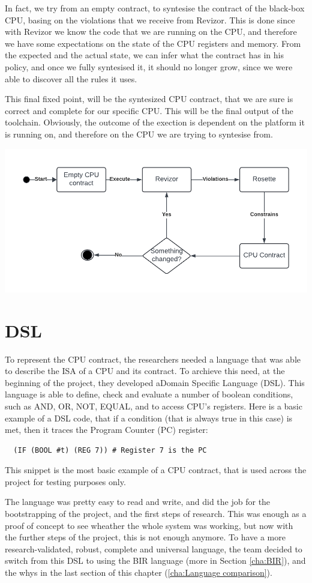 In fact, we try from an empty contract, to syntesise the contract of the black-box
CPU, basing on the violations that we receive from Revizor. This is done since with
Revizor we know the code that we are running on the CPU, and therefore we have
some expectations on the state of the CPU registers and memory. From the expected
and the actual state, we can infer what the contract has in his policy, and once
we fully syntesised it, it should no longer grow, since we were able to discover
all the rules it uses.

This final fixed point, will be the syntesized CPU contract, that we are sure is
correct and complete for our specific CPU. This will be the final output of the
toolchain. Obviously, the outcome of the exection is dependent on the platform
it is running on, and therefore on the CPU we are trying to syntesise from.
\begin{center}
  \includegraphics[width=.6\textwidth]{images/Thesis.png}
\end{center}

\section{DSL}
\label{cha:DSL} To represent the CPU contract, the researchers needed a language
that was able to describe the ISA of a CPU and its contract. To archieve this need,
at the beginning of the project, they developed aDomain Specific Language (DSL).
This language is able to define, check and evaluate a number of boolean conditions,
such as AND, OR, NOT, EQUAL, and to access CPU's registers. Here is a basic example
of a DSL code, that if a condition (that is always true in this case) is met, then
it traces the Program Counter (PC) register:

\begin{verbatim}
  (IF (BOOL #t) (REG 7)) # Register 7 is the PC
\end{verbatim}

This snippet is the most basic example of a CPU contract, that is used across the
project for testing purposes only.

The language was pretty easy to read and write, and did the job for the
bootstrapping of the project, and the first steps of research. This was enough
as a proof of concept to see wheather the whole system was working, but now with
the further steps of the project, this is not enough anymore. To have a more research-validated,
robust, complete and universal language, the team decided to switch from this
DSL to using the BIR language (more in Section \ref{cha:BIR}), and the whys in the
last section of this chapter (\ref{cha:Language comparison}).

